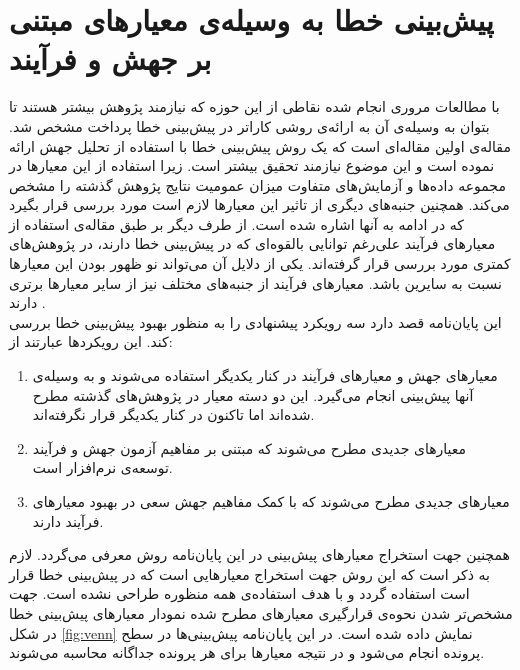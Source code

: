 \chapter{پیش‌بینی خطا به وسیله‌ی معیارهای مبتنی بر جهش و فرآیند}
 
\label{chap:method}
با  مطالعات مروری انجام شده نقاطی از این حوزه که نیازمند پژوهش بیشتر هستند تا بتوان به وسیله‌ی آن به ارائه‌ی روشی کاراتر در پیش‌بینی خطا پرداخت مشخص شد. مقاله‌ی \cite{bowes2016mutation} اولین مقاله‌ای است که  یک  روش پیش‌بینی خطا با استفاده از تحلیل جهش ارائه نموده  است و این موضوع نیازمند تحقیق بیشتر است. زیرا  استفاده از این معیارها در مجموعه داده‌ها و آزمایش‌های متفاوت میزان  عمومیت نتایج پژوهش گذشته را مشخص می‌کند. همچنین جنبه‌های دیگری از  تاثیر این معیارها لازم است مورد بررسی قرار بگیرد که در ادامه به آنها اشاره شده است. از طرف دیگر بر طبق مقاله‌ی \cite{radjenovic2013software} استفاده از معیارهای فرآیند علی‌رغم توانایی بالقوه‌ای که در پیش‌بینی خطا دارند، در پژوهش‌های کمتری مورد بررسی قرار گرفته‌اند. یکی از دلایل آن می‌تواند نو ظهور بودن این معیارها نسبت به سایرین باشد. معیارهای فرآیند از جنبه‌های مختلف نیز از سایر معیار‌ها برتری دارند \cite{rahman2013and}. \\
این پایان‌نامه قصد دارد سه رویکرد  پیشنهادی را به منظور بهبود پیش‌بینی خطا بررسی کند.  این رویکردها عبارتند از:
\begin{enumerate}
\item
معیارهای جهش و معیارهای فرآیند در کنار یکدیگر استفاده می‌شوند و به وسیله‌ی آنها پیش‌بینی انجام می‌گیرد. این دو دسته معیار در پژوهش‌های گذشته مطرح شده‌اند اما تاکنون در کنار یکدیگر قرار نگرفته‌اند.
\item
معیارهای جدیدی مطرح می‌شوند که مبتنی بر مفاهیم آزمون جهش و فرآیند توسعه‌ی نرم‌افزار است.
\item
معیارهای جدیدی مطرح می‌شوند که با کمک مفاهیم جهش سعی در بهبود معیارهای فرآیند دارند.
\end{enumerate}

همچنین جهت استخراج معیارهای پیش‌بینی در این پایان‌نامه روش 
 معرفی می‌گردد. لازم به ذکر است که این روش جهت  استخراج معیارهایی است که در پیش‌بینی خطا قرار است استفاده گردد و با هدف استفاده‌ی همه منظوره طراحی نشده است. جهت مشخص‌تر شدن نحوه‌ی قرارگیری معیارهای مطرح شده نمودار  معیارهای پیش‌بینی خطا در شکل \ref{fig:venn} نمایش داده شده است.  در این پایان‌نامه پیش‌بینی‌ها در سطح پرونده انجام می‌شود و در نتیجه معیارها برای هر پرونده جداگانه محاسبه می‌شوند.

